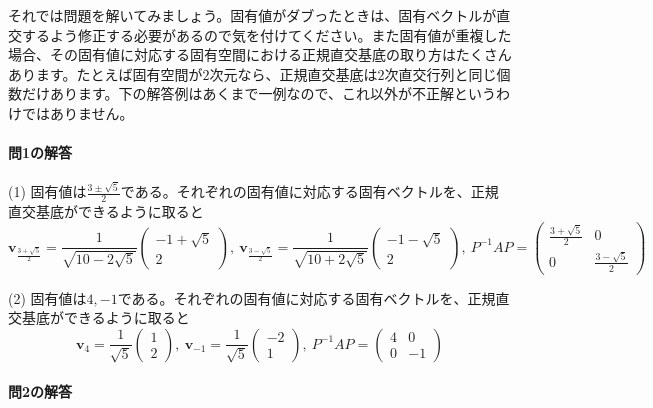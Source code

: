 それでは問題を解いてみましょう。固有値がダブったときは、固有ベクトルが直交するよう修正する必要があるので気を付けてください。また固有値が重複した場合、その固有値に対応する固有空間における正規直交基底の取り方はたくさんあります。たとえば固有空間が$2$次元なら、正規直交基底は$2$次直交行列と同じ個数だけあります。下の解答例はあくまで一例なので、これ以外が不正解というわけではありません。

\paragraph{問1の解答}

\noindent (1) 固有値は$\frac{3 \pm \sqrt{5}}{2}$である。それぞれの固有値に対応する固有ベクトルを、正規直交基底ができるように取ると
\[
\bm{v}_{\frac{3 + \sqrt{5}}{2}} =
\frac{1}{\sqrt{10 - 2 \sqrt{5}}}
\begin{pmatrix}
-1 + \sqrt{5} \\
2
\end{pmatrix}, \ 
\bm{v}_{\frac{3 - \sqrt{5}}{2}} =
\frac{1}{\sqrt{10 + 2 \sqrt{5}}}
\begin{pmatrix}
-1 - \sqrt{5} \\
2
\end{pmatrix}, \ 
P^{-1} A P 
= 
\begin{pmatrix}
\frac{3 + \sqrt{5}}{2} & 0 \\
0 & \frac{3 - \sqrt{5}}{2}
\end{pmatrix}
\]

\noindent (2) 固有値は$4, -1$である。それぞれの固有値に対応する固有ベクトルを、正規直交基底ができるように取ると
\[
\bm{v}_{4} =
\frac{1}{\sqrt{5}}
\begin{pmatrix}
1 \\
2
\end{pmatrix}, \ 
\bm{v}_{-1} =
\frac{1}{\sqrt{5}}
\begin{pmatrix}
-2 \\
1
\end{pmatrix}, \ 
P^{-1} A P 
= 
\begin{pmatrix}
4 & 0 \\
0 & -1
\end{pmatrix}
\]

\paragraph{問2の解答}

